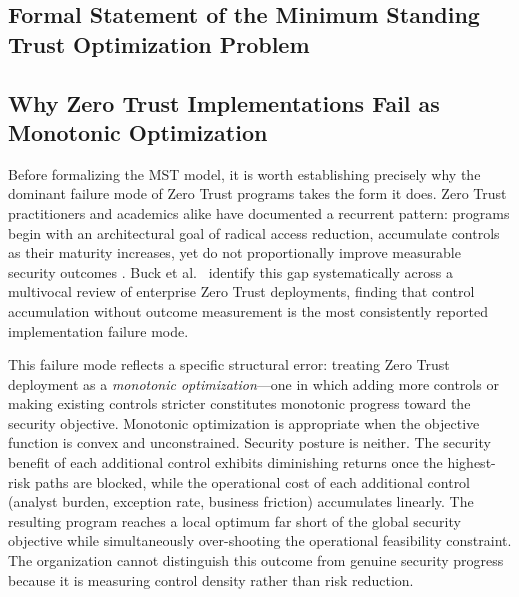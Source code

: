\documentclass[unnumsec,webpdf,contemporary,large]{oup-authoring-template}
\theoremstyle{thmstyleone}
\theoremstyle{thmstyletwo}
\theoremstyle{thmstylethree}
\begin{document}
\begin{appendices}

\renewcommand{\theequation}{A.\arabic{equation}}
\renewcommand{\thefigure}{A.\arabic{figure}}
\renewcommand{\thetable}{A.\arabic{table}}
\setcounter{equation}{0}
\setcounter{figure}{0}
\setcounter{table}{0}

\section{Formal Statement of the Minimum Standing Trust Optimization Problem}
\label{app:formal}

\subsection{Why Zero Trust Implementations Fail as Monotonic Optimization}
\label{app:A1}

Before formalizing the MST model, it is worth establishing precisely why the dominant
failure mode of Zero Trust programs takes the form it does. Zero Trust practitioners
and academics alike have documented a recurrent pattern: programs begin with an
architectural goal of radical access reduction, accumulate controls as their maturity
increases, yet do not proportionally improve measurable security outcomes
\cite{buck2021}. Buck et al.\ \cite{buck2021} identify this gap
systematically across a multivocal review of enterprise Zero Trust deployments,
finding that control accumulation without outcome measurement is the most
consistently reported implementation failure mode.

This failure mode reflects a specific structural error: treating Zero Trust deployment
as a \textit{monotonic optimization}---one in which adding more controls or making
existing controls stricter constitutes monotonic progress toward the security objective.
Monotonic optimization is appropriate when the objective function is convex and
unconstrained. Security posture is neither. The security benefit of each additional
control exhibits diminishing returns once the highest-risk paths are blocked, while
the operational cost of each additional control (analyst burden, exception rate,
business friction) accumulates linearly. The resulting program reaches a local
optimum far short of the global security objective while simultaneously
over-shooting the operational feasibility constraint. The organization cannot
distinguish this outcome from genuine security progress because it is measuring
control density rather than risk reduction.


\end{appendices}
\end{document}
